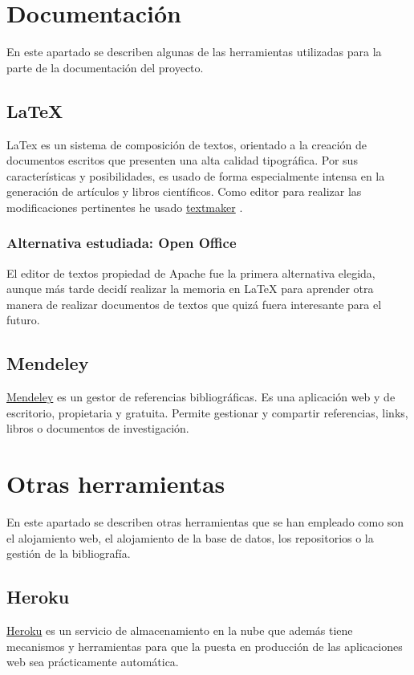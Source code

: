 
\section{Documentación}\label{docs}
En este apartado se describen algunas de las herramientas utilizadas para la parte de la documentación del proyecto.

 \subsection{LaTeX}\label{latex}
  LaTex es un sistema de composición de textos, orientado a la creación de documentos escritos que presenten una alta calidad tipográfica. Por sus características y posibilidades, es usado de forma especialmente intensa en la generación de artículos y libros científicos. Como editor para realizar las modificaciones pertinentes he usado \hyperlink{http://www.xm1math.net/texmaker/}{textmaker} .
  
 
 \subsubsection{Alternativa estudiada: Open Office}\label{openoffice}
El editor de textos propiedad de Apache fue la primera alternativa elegida, aunque más tarde decidí realizar la memoria en LaTeX para aprender otra manera de realizar documentos de textos que quizá fuera interesante para el futuro.

 \subsection{Mendeley}\label{mendeley}
  \hyperlink{www.mendeley.com/}{Mendeley} es un gestor de referencias bibliográficas. Es una aplicación web y de escritorio, propietaria y gratuita. Permite gestionar y compartir referencias, links, libros o documentos de investigación.
  
  \section{Otras herramientas}\label{herramientas}
En este apartado se describen otras herramientas que se han empleado como son el alojamiento web, el alojamiento de la base de datos, los repositorios o la gestión de la bibliografía.

 \subsection{Heroku}\label{heroku}
\hyperlink{https://www.heroku.com/}{Heroku}  es un servicio de almacenamiento en la nube que además tiene mecanismos y herramientas para que la puesta en producción de las aplicaciones web sea prácticamente automática.

